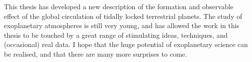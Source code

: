 This thesis has developed a new description of the formation and observable effect of the global circulation of tidally locked terrestrial planets. The study of exoplanetary atmospheres is still very young, and has allowed the work in this thesis to be touched by a great range of stimulating ideas, techniques, and (occasional) real data. I hope that the huge potential of exoplanetary science can be realised, and that there are many more surprises to come.


% 
% 

